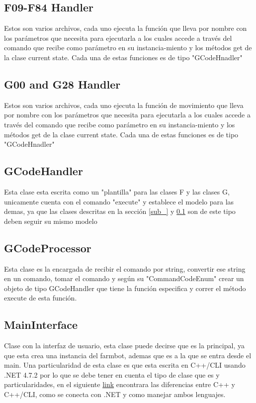 \documentclass[letterpaper,12pt]{article}
\begin{document}
	\subsection{F09-F84 Handler}
	\label{sub_F}
	Estos son varios archivos, cada uno ejecuta la función que lleva por nombre con los parámetros que necesita para ejecutarla a los cuales accede a través del comando que recibe como parámetro en su instancia-miento y los métodos get de la clase current state. Cada una de estas funciones es de tipo "GCodeHnadler"
	\subsection{G00 and G28 Handler}
	\label{sub_G}
		Estos son varios archivos, cada uno ejecuta la función de movimiento que lleva por nombre con los parámetros que necesita para ejecutarla a los cuales accede a través del comando que recibe como parámetro en su instancia-miento y los métodos get de la clase current state. Cada una de estas funciones es de tipo "GCodeHnadler"
	\subsection{GCodeHandler}
	Esta clase esta escrita como un "plantilla" para las clases F y las clases G, unicamente cuenta con el comando "execute" y establece el modelo para las demas, ya que las clases descritas en la sección \ref{sub_} y \ref{sub_F} son de este tipo deben seguir su mismo modelo
	
	\subsection{GCodeProcessor}
	Esta clase es la encargada de recibir el comando por string, convertir ese string en un comando, tomar el comando y según su "CommandCodeEnum" crear un objeto de tipo GCodeHandler que tiene la función especifica y correr el método execute de esta función.
	\subsection{MainInterface}
	Clase con la interfaz de usuario, esta clase puede decirse que es la principal, ya que esta crea una instancia del farmbot, ademas que es a la que se entra desde el main. Una particularidad de esta clase es que esta escrita en C++/CLI usando .NET 4.7.2 por lo que se debe tener en cuenta el tipo de clase que es y particularidades, en el siguiente \href{https://geeks.ms/rfog/2009/06/15/qu-es-c-y-qu-es-ccli/}{link} encontrara las diferencias entre C++ y C++/CLI, como se conecta con .NET y como manejar ambos lenguajes.
\end{document}
